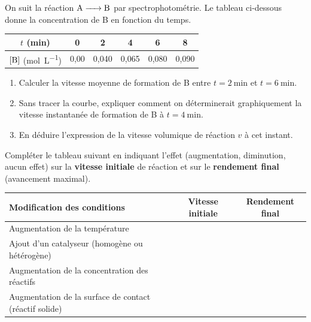 \documentclass[11pt]{article}
\begin{document}
\begin{exercice}
On suit la réaction $\ce{A -> B}$ par spectrophotométrie. Le tableau ci-dessous donne la concentration de B en fonction du temps.

\begin{center}
\begin{tabular}{|c|c|c|c|c|c|}
\hline
$t$ (\si{\minute}) & 0 & 2 & 4 & 6 & 8 \\ \hline
$[\ce{B}]$ (\si{\mol\per\liter}) & 0,00 & 0,040 & 0,065 & 0,080 & 0,090 \\ \hline
\end{tabular}
\end{center}

\begin{enumerate}
    \item Calculer la vitesse moyenne de formation de B entre $t = \SI{2}{\minute}$ et $t = \SI{6}{\minute}$.
    \item Sans tracer la courbe, expliquer comment on déterminerait graphiquement la vitesse instantanée de formation de B à $t = \SI{4}{\minute}$.
    \item En déduire l'expression de la vitesse volumique de réaction $v$ à cet instant.
\end{enumerate}
\end{exercice}

\begin{exercice}
Compléter le tableau suivant en indiquant l'effet (augmentation, diminution, aucun effet) sur la \textbf{vitesse initiale} de réaction et sur le \textbf{rendement final} (avancement maximal).

\begin{center}
\begin{tabular}{|l|c|c|}
\hline
\textbf{Modification des conditions} & \textbf{Vitesse initiale} & \textbf{Rendement final} \\ \hline
Augmentation de la température &  &  \\ \hline
Ajout d'un catalyseur (homogène ou hétérogène) &  &  \\ \hline
Augmentation de la concentration des réactifs &  &  \\ \hline
Augmentation de la surface de contact (réactif solide) &  &  \\ \hline
\end{tabular}
\end{center}
\end{exercice}
\end{document}
